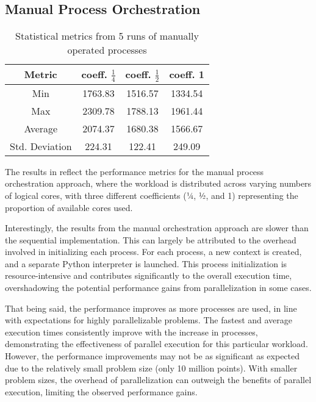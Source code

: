 \documentclass[a4paper, oneside]{article}
\begin{document}
\subsection{Manual Process Orchestration}
\begin{table}[h]
    \centering
    \begin{tabular}{c | c | c | c}
        Metric         & coeff. $\frac{1}{4}$ & coeff. $\frac{1}{2}$ & coeff. 1 \\
        \hline
        Min            & 1763.83              & 1516.57              & 1334.54  \\
        \hline
        Max            & 2309.78              & 1788.13              & 1961.44  \\
        \hline
        Average        & 2074.37              & 1680.38              & 1566.67  \\
        \hline
        Std. Deviation & 224.31               & 122.41               & 249.09   \\
        \hline
    \end{tabular}
    \caption{Statistical metrics from 5 runs of manually operated processes}
    \label{table:manual-processes}
\end{table}
The results in  reflect the performance metrics for the manual process orchestration approach, where the workload is distributed across varying numbers of logical cores, with three different coefficients (¼, ½, and 1) representing the proportion of available cores used.

Interestingly, the results from the manual orchestration approach are slower than the sequential implementation. This can largely be attributed to the overhead involved in initializing each process. For each process, a new context is created, and a separate Python interpreter is launched. This process initialization is resource-intensive and contributes significantly to the overall execution time, overshadowing the potential performance gains from parallelization in some cases.

That being said, the performance improves as more processes are used, in line with expectations for highly parallelizable problems. The fastest and average execution times consistently improve with the increase in processes, demonstrating the effectiveness of parallel execution for this particular workload. However, the performance improvements may not be as significant as expected due to the relatively small problem size (only 10 million points). With smaller problem sizes, the overhead of parallelization can outweigh the benefits of parallel execution, limiting the observed performance gains.
\end{document}
